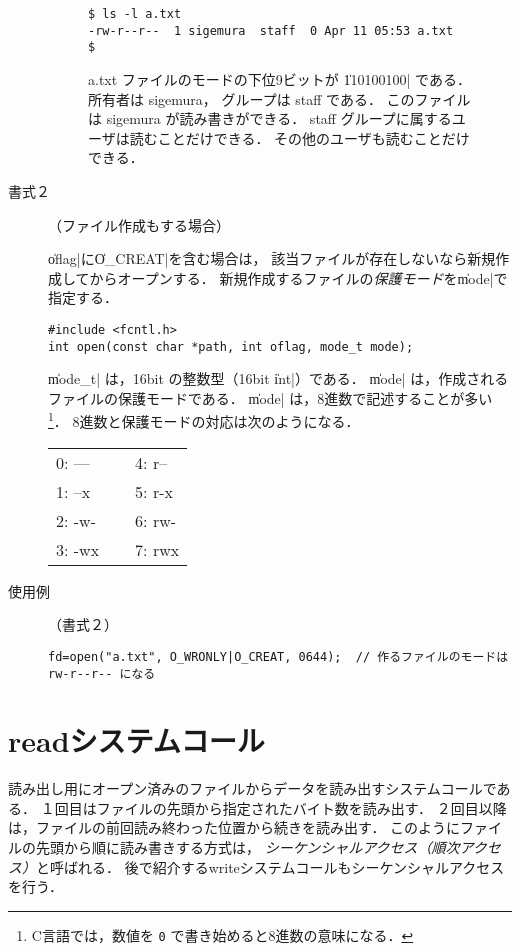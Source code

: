 \begin{description}
\begin{figure}[tb]
\begin{framed}
\begin{lstlisting}[numbers=none]
$ ls -l a.txt
-rw-r--r--  1 sigemura  staff  0 Apr 11 05:53 a.txt
$
\end{lstlisting}

a.txt ファイルのモードの下位9ビットが \|110100100| である．
所有者は sigemura，
グループは staff である．
このファイルは sigemura が読み書きができる．
staff グループに属するユーザは読むことだけできる．
その他のユーザも読むことだけできる．
\end{framed}
\end{figure}

\item[書式２]（ファイル作成もする場合）

\|oflag|に\|O_CREAT|を含む場合は，
該当ファイルが存在しないなら新規作成してからオープンする．
新規作成するファイルの\emph{保護モード}を\|mode|で指定する．

\begin{lstlisting}[numbers=none]
#include <fcntl.h>
int open(const char *path, int oflag, mode_t mode);
\end{lstlisting}

\|mode_t| は，16bit の整数型（16bit \|int|）である．
\|mode| は，作成されるファイルの保護モードである．
\|mode| は，8進数で記述することが多い\footnote{
C言語では，数値を \texttt{0} で書き始めると8進数の意味になる．}．
8進数と保護モードの対応は次のようになる．

{\ttfamily\begin{center}\begin{tabular}{l l}
0: --- ~~~ & 4: r-- \\
1: --x     & 5: r-x \\
2: -w-     & 6: rw- \\
3: -wx     & 7: rwx
\end{tabular}\end{center}}

\item[使用例]（書式２）

\begin{lstlisting}[numbers=none]
fd=open("a.txt", O_WRONLY|O_CREAT, 0644);  // 作るファイルのモードは rw-r--r-- になる
\end{lstlisting}

\end{description}

\section{readシステムコール}
読み出し用にオープン済みのファイルからデータを読み出すシステムコールである．
１回目はファイルの先頭から指定されたバイト数を読み出す．
２回目以降は，ファイルの前回読み終わった位置から続きを読み出す．
このようにファイルの先頭から順に読み書きする方式は，
\emph{シーケンシャルアクセス（順次アクセス）}と呼ばれる．
後で紹介するwriteシステムコールもシーケンシャルアクセスを行う．

